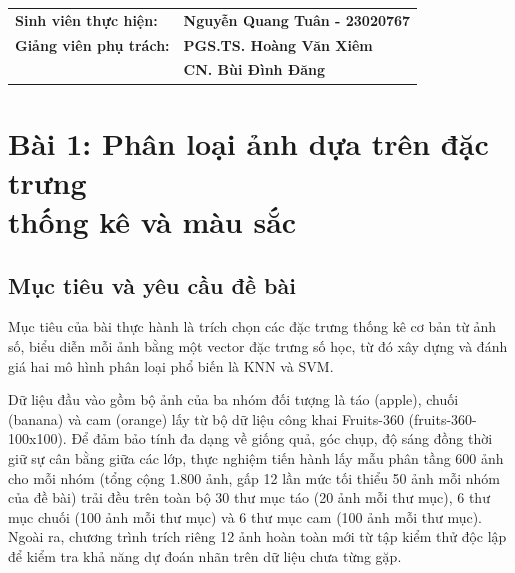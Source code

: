 \documentclass[12pt,a4paper]{article}
\begin{document}
\begin{titlepage}
\vspace{2.2cm}

\begin{flushleft}
\hspace{2.2cm}
\begin{tabular}{ll}
\textbf{Sinh viên thực hiện:} & \textbf{Nguyễn Quang Tuân - 23020767} \\[0.4cm]
\textbf{Giảng viên phụ trách:} & \textbf{PGS.TS. Hoàng Văn Xiêm} \\
                                & \textbf{CN. Bùi Đình Đăng}
\end{tabular}
\end{flushleft}

\vfill
\end{titlepage}

\newpage
{}
\tableofcontents
\newpage
{}

\section[Bài 1: Phân loại ảnh dựa trên đặc trưng thống kê và màu sắc]{Bài 1: Phân loại ảnh dựa trên đặc trưng\\thống kê và màu sắc}

\subsection{Mục tiêu và yêu cầu đề bài}
Mục tiêu của bài thực hành là trích chọn các đặc trưng thống kê cơ bản từ ảnh số, biểu diễn mỗi ảnh bằng một vector đặc trưng số học, từ đó xây dựng và đánh giá hai mô hình phân loại phổ biến là KNN và SVM.

Dữ liệu đầu vào gồm bộ ảnh của ba nhóm đối tượng là táo (apple), chuối (banana) và cam (orange) lấy từ bộ dữ liệu công khai Fruits-360 (fruits-360-100x100). Để đảm bảo tính đa dạng về giống quả, góc chụp, độ sáng đồng thời giữ sự cân bằng giữa các lớp, thực nghiệm tiến hành lấy mẫu phân tầng 600 ảnh cho mỗi nhóm (tổng cộng 1.800 ảnh, gấp 12 lần mức tối thiểu 50 ảnh mỗi nhóm của đề bài) trải đều trên toàn bộ 30 thư mục táo (20 ảnh mỗi thư mục), 6 thư mục chuối (100 ảnh mỗi thư mục) và 6 thư mục cam (100 ảnh mỗi thư mục). Ngoài ra, chương trình trích riêng 12 ảnh hoàn toàn mới từ tập kiểm thử độc lập để kiểm tra khả năng dự đoán nhãn trên dữ liệu chưa từng gặp.
\end{document}
